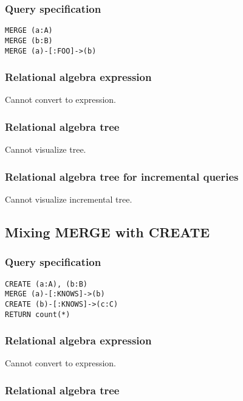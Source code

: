 \subsubsection*{Query specification}

\begin{lstlisting}
MERGE (a:A)
MERGE (b:B)
MERGE (a)-[:FOO]->(b)
\end{lstlisting}

\subsubsection*{Relational algebra expression}

Cannot convert to expression.

\subsubsection*{Relational algebra tree}

Cannot visualize tree.

\subsubsection*{Relational algebra tree for incremental queries}

Cannot visualize incremental tree.

\subsection{Mixing MERGE with CREATE}

\subsubsection*{Query specification}

\begin{lstlisting}
CREATE (a:A), (b:B)
MERGE (a)-[:KNOWS]->(b)
CREATE (b)-[:KNOWS]->(c:C)
RETURN count(*)
\end{lstlisting}

\subsubsection*{Relational algebra expression}

Cannot convert to expression.

\subsubsection*{Relational algebra tree}

